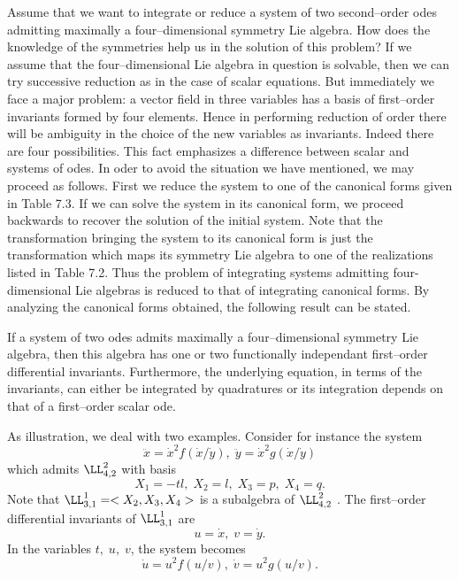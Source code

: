 Assume that we want to integrate or reduce a system of two second--order odes
admitting maximally a four--dimensional symmetry Lie algebra.
How does the knowledge of the symmetries help us in the solution of
this problem?
If we assume that the four--dimensional Lie algebra in question is
solvable, then we can try successive reduction as in the case of scalar
equations. But immediately we face a major problem: a vector field in
three variables has a basis of first--order invariants formed by four elements.
Hence in performing reduction of order there will be ambiguity in
the choice of the  new variables as invariants.
Indeed there are four possibilities. This fact emphasizes a difference
between scalar and systems of odes. In oder to avoid the situation we have
mentioned, we  may proceed
as follows. First we reduce the system to one of the canonical forms given in 
Table 7.3. If we can solve the system in its canonical form, 
we proceed backwards to recover the solution of the initial system. Note that
the transformation bringing the system to its canonical
form is just the transformation which maps its symmetry Lie algebra to one
of the realizations listed in Table 7.2.  Thus the problem of 
integrating systems admitting four-dimensional Lie algebras is reduced to
that of integrating canonical forms. By analyzing the canonical forms
obtained, the following result  can be stated.
\begin{prop}
\label{ch7:p1}
\begin{em}
If a system of two odes admits maximally  a four--dimensional symmetry
Lie algebra, then this algebra  has one or two functionally independant
first--order differential invariants. Furthermore, the underlying equation,
in terms of the invariants, can either be integrated by quadratures or its
integration depends on that of a first--order scalar ode.
\end{em}
\end{prop}
As illustration, we deal with two examples. 
Consider for instance the system
\begin{equation}
\label{ch7:z1}
\ddot x=\dot x^2f(\dot x/\dot y),\;\ddot y=\dot x^2g(\dot x/\dot y)
\end{equation}
which admits $\LL_{4,2}^2$ with basis
\[X_1=-tl,\;X_2=l,\;X_3=p,\;X_4=q.\]
Note that $\LL_{3,1}^1=<X_2,X_3,X_4>$ is a subalgebra of $\LL_{4,2}^2$ 
. The first--order differential invariants of
$\LL_{3,1}^1$ are 
\[u=\dot x,\; v=\dot y.\]
In the variables $t,\;u,\;v$, the system becomes
\begin{equation}
\label{ch7:z2}
\dot u=u^2f(u/v),\;\dot v=u^2g(u/v).
\end{equation}
